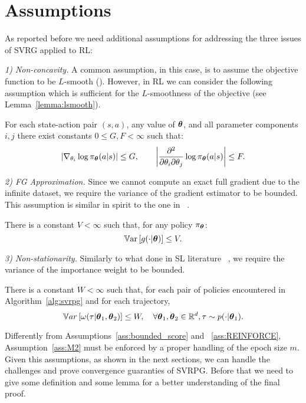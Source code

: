 \section{Assumptions}\label{sec:assumption}

As reported before we need additional assumptions for addressing the three issues of \acs{SVRG} applied to \acs{RL}:

\textit{1) Non-concavity.} A common assumption, in this case, is to assume the objective function to be $L$-smooth (\cite{reddi2016stochastic,allen2016variance}).
However, in \acs{RL} we can consider the following assumption which is sufficient for the $L$-smoothness of the objective (see Lemma~\ref{lemma:lsmooth}).

\begin{assumption}\label{ass:bounded_score}
	For each state-action pair $(s,a)$, any value of $\boldsymbol{\theta}$, and all parameter components $i,j$ there exist constants $0 \leq G,F<\infty$ such that:
	\[
	\left|\nabla_{\theta_i}\log\pi_{\boldsymbol{\theta}}(a\vert s)\right| \leq G, \qquad
	\left|\frac{\partial^2}{\partial\theta_i\partial\theta_j}\log\pi_{\boldsymbol{\theta}}(a \vert s)\right| \leq F.
	\]
\end{assumption}

\textit{2) \acs{FG} Approximation.}
Since we cannot compute an exact full gradient due to the infinite dataset, we require the variance of the gradient estimator to be bounded.
This assumption is similar in spirit to the one in ~\cite{harikandeh2015stopwasting}.
\begin{assumption}\label{ass:REINFORCE}
	There is a constant $V<\infty$ such that, for any policy $\pi_{\boldsymbol{\theta}}$:
	\[
	\operatorname*{\mathbb{V}ar}\left[g(\cdot\vert\boldsymbol{\theta})\right] \leq V.
	\]
\end{assumption}

\textit{3) Non-stationarity.} 
Similarly to what done in \acs{SL} literature ~\citep{cortes2010learning}, we require the variance of the importance weight to be bounded.
\begin{assumption}\label{ass:M2}
	There is a constant $W<\infty$ such that, for each pair of policies encountered in Algorithm~\ref{alg:svrpg} and for each trajectory,
	\[
	\mathbb{V}ar\left[\omega(\tau| \boldsymbol{\theta}_1, \boldsymbol{\theta}_2)\right] \leq W, \quad \forall \boldsymbol{\theta}_1,\boldsymbol{\theta}_2 \in \mathbb R^d , \tau \sim p(\cdot|\boldsymbol{\theta}_1).
	\]
\end{assumption}
Differently from Assumptions~\ref{ass:bounded_score} and ~\ref{ass:REINFORCE}, Assumption~\ref{ass:M2} must be enforced by a proper handling of the epoch size $m$.\newline
Given this assumptions, as shown in the next sections, we can handle the challenges and prove convergence guaranties of \acs{SVRPG}. Before that we need to give some definition and some lemma for a better  understanding of the final proof.


